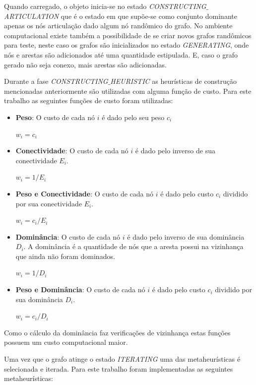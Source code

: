 \documentclass[conference,compsoc]{IEEEtran}
\begin{document}
Quando carregado, o objeto inicia-se no estado \textit{CONSTRUCTING$\_$ARTICULATION} que é o estado em que supõe-se como conjunto dominante apenas os nós articulação dado algum nó randômico do grafo. No ambiente computacional existe também a possibilidade de se criar novos grafos randômicos para teste, neste caso os grafos são inicializados no estado \textit{GENERATING}, onde nós e arestas são adicionados até uma quantidade estipulada. E, caso o grafo gerado não seja conexo, mais arestas são adicionadas.

Durante a fase \textit{CONSTRUCTING$\_$HEURISTIC} as heurísticas de construção mencionadas anteriormente são utilizadas com alguma função de custo. Para este trabalho as seguintes funções de custo foram utilizadas:

\begin{itemize}
    \item \textbf{Peso}: O custo de cada nó $i$ é dado pelo seu peso $c_i$
    
    \subitem $w_i = c_i$
    
    \item \textbf{Conectividade}: O custo de cada nó $i$ é dado pelo inverso de sua conectividade $E_i$.
    
    \subitem $w_i = 1 / E_i$
    
    \item \textbf{Peso e Conectividade}: O custo de cada nó $i$ é dado pelo custo $c_i$ dividido por sua conectividade $E_i$.
    
    \subitem $w_i = c_i / E_i$
    
    \item \textbf{Dominância}: O custo de cada nó $i$ é dado pelo inverso de sua dominância $D_i$. A dominância é a quantidade de nós que a aresta possui na vizinhança que ainda não foram dominados.
    
    \subitem $w_i = 1 / D_i$
    
    \item \textbf{Peso e Dominância}: O custo de cada nó $i$ é dado pelo custo $c_i$ dividido por sua dominância $D_i$.
    
    \subitem $w_i = c_i / D_i$
\end{itemize}

Como o cálculo da dominância faz verificações de vizinhança estas funções possuem um custo computacional maior.

Uma vez que o grafo atinge o estado \textit{ITERATING} uma das metaheurísticas é selecionada e iterada. Para este trabalho foram implementadas as seguintes metaheurísticas:
\end{document}
